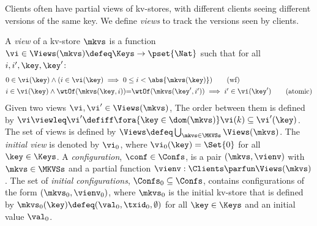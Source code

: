 Clients often have partial views of kv-stores, 
with different clients seeing 
different versions of the same key.
We define \emph{views} to track the versions seen by clients. 

\begin{definition}
\label{def:view}
\label{def:cuts}
\label{def:views}
\label{def:configuration}
A \emph{view} of a kv-store $\mkvs$ is a function
$\vi \in \Views(\mkvs) \defeq \Keys \to\pset{\Nat}$ such that for all $i, i', \key, \key'$:
%
{
\begin{align}
    & 
    0 \in \vi(\key) 
    \land (i \in \vi(\key) \implies 0 \leq i < \abs{ \mkvs(\key) }) 
    \tag{wf}
    \label{eq:view.wf}\\
    & 
    \begin{array}{@{}l@{}}
	i \in \vi(\key)  
  	\land \wtOf(\mkvs(\key, i)) {=} \wtOf(\mkvs(\key', i'))  
  	\implies i' \in \vi(\key')
    \end{array}
	\tag{atomic}
	\label{eq:view.atomic}
\end{align}
}
Given two views $\vi, \vi' \in \Views(\mkvs)$, 
The order between them is defined by $\vi \viewleq \vi' \defiff \fora{\key \in \dom(\mkvs)} \vi(k) \subseteq \vi'(\key)$.
The set of views is defined by $\Views \defeq \bigcup_{\mkvs \in \MKVSs} \Views(\mkvs)$.
%
\noindent The \emph{initial view} is denoted by $\vi_{0}$, where $\vi_{0}(\key) = \Set{0}$ for all $\key \in \Keys$. 
A \emph{configuration}, $\conf \in \Confs$,  is a pair $ (\mkvs, \vienv)$
with $\mkvs \in \MKVSs$ and a partial function
$\vienv : \Clients \parfun \Views(\mkvs)$. 
The set of \emph{initial configurations}, $\Confs_0 \subseteq \Confs$, contains configurations of the form $ (\mkvs_0, \vienv_0)$, where $\mkvs_0$ is the initial kv-store
that is defined by
$\mkvs_{0}(\key)\defeq  (\val_0, \txid_0, \emptyset)$ for
all $\key \in \Keys$ and an initial value \( \val_0 \).
\end{definition}
